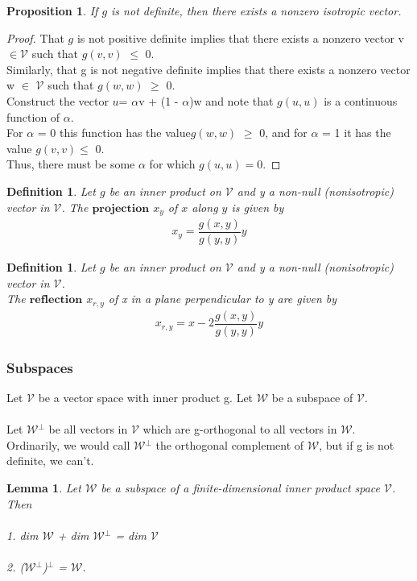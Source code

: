 \documentclass[12pt,a4paper]{article}
\newtheorem{lem}[thm]{Lemma}
\newtheorem{defn}[thm]{Definition}
\newtheorem{prop}{Proposition}
\begin{document}
\begin{prop}
If $g$ is not definite, then there exists a nonzero
isotropic vector.
\end{prop}
\begin{proof}
That $g$ is not positive definite implies that there exists a nonzero vector v$\in$$\mathcal{V}$ such that $g(v, v)$ $\leq$ 0. \\Similarly, that g is not negative definite
implies that there exists a nonzero vector w $\in$ $\mathcal{V}$ such that $g(w, w)$ $\geq$ 0. \\Construct the vector $u $= $\alpha$v + (1 - $\alpha$)w and note that $g(u, u)$ is a continuous function of $\alpha$. \\For $\alpha$ = 0 this function has the value$g(w, w)$ $\geq$ 0, and for $\alpha$ = 1 it has the value $g(v, v) $$\leq$ 0. \\Thus, there must be some $\alpha$ for which $g(u, u) = 0.$
\end{proof}
\begin{defn}
Let $g$ be an inner product on $\mathcal{V}$ and y a non-null (nonisotropic) vector in $\mathcal{V}$. The $\textbf{projection}$ $x_y$ of $x$ along $y$ is given by 
\begin{align*}
x_y = \dfrac{g(x,y)}{g(y,y)} y
\end{align*}
\end{defn}
\begin{defn}
Let $g$ be an inner product on $\mathcal{V}$ and y a non-null (nonisotropic) vector in $\mathcal{V}$. \\The $\textbf{reflection}$ $x_{r,y}$ of x in a plane perpendicular to y are given by 
\begin{align*}
x_{r,y} = x - 2 \dfrac{g(x,y)}{g(y,y)} y
\end{align*}
\end{defn}

\subsubsection{Subspaces}
Let $\mathcal{V}$ be a vector space with inner product g. Let $\mathcal{W}$ be a subspace of $\mathcal{V}$.\\\\
Let $\mathcal{W}$$^\perp$ be all vectors in $\mathcal{V}$ which are g-orthogonal to all vectors in $\mathcal{W}$.\\
Ordinarily, we would call $\mathcal{W}$$^\perp$ the orthogonal complement of $\mathcal{W}$, but if g
is not definite, we can’t.
\begin{lem}
Let $\mathcal{W}$ be a subspace of a finite-dimensional inner product
space $\mathcal{V}$. Then\\\\
1. dim $\mathcal{W}$ + dim $\mathcal{W}$$^\perp$ = dim $\mathcal{V}$\\\\
2. ($\mathcal{W}$$^\perp$)$^\perp$ = $\mathcal{W}$.
\end{lem}
\end{document}
